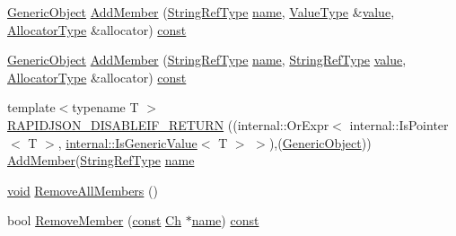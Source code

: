\begin{DoxyCompactItemize}
\item 
\hyperlink{classGenericObject}{Generic\+Object} \hyperlink{classGenericObject_a011a0dd06baf841e3f6e21a3c95db3c1}{Add\+Member} (\hyperlink{classGenericObject_a9b8381fc96f5f89b2163b052ed66cc59}{String\+Ref\+Type} \hyperlink{imgui__impl__opengl3__loader_8h_a5c4947d4516dd7cfa3505ce3a648a4ef}{name}, \hyperlink{classGenericObject_a930aa30f89caee7ba7bff60bf9dc21b1}{Value\+Type} \&\hyperlink{imgui__impl__opengl3__loader_8h_a32aff7c6c4cd253fdf6563677afab5ce}{value}, \hyperlink{classGenericObject_a00c8cee952d5ebadc5e1c309aa489ad9}{Allocator\+Type} \&allocator) \hyperlink{classGenericObject_af70c9646b5e422306c33e98b3d8783a7}{const}
\item 
\hyperlink{classGenericObject}{Generic\+Object} \hyperlink{classGenericObject_a3af43681aea03c4313d689bcbf5e3363}{Add\+Member} (\hyperlink{classGenericObject_a9b8381fc96f5f89b2163b052ed66cc59}{String\+Ref\+Type} \hyperlink{imgui__impl__opengl3__loader_8h_a5c4947d4516dd7cfa3505ce3a648a4ef}{name}, \hyperlink{classGenericObject_a9b8381fc96f5f89b2163b052ed66cc59}{String\+Ref\+Type} \hyperlink{imgui__impl__opengl3__loader_8h_a32aff7c6c4cd253fdf6563677afab5ce}{value}, \hyperlink{classGenericObject_a00c8cee952d5ebadc5e1c309aa489ad9}{Allocator\+Type} \&allocator) \hyperlink{classGenericObject_af70c9646b5e422306c33e98b3d8783a7}{const}
\item 
{\footnotesize template$<$typename T $>$ }\\\hyperlink{classGenericObject_af361a4b677882964789201fc605541d0}{R\+A\+P\+I\+D\+J\+S\+O\+N\+\_\+\+D\+I\+S\+A\+B\+L\+E\+I\+F\+\_\+\+R\+E\+T\+U\+RN} ((internal\+::\+Or\+Expr$<$ internal\+::\+Is\+Pointer$<$ T $>$, \hyperlink{structinternal_1_1IsGenericValue}{internal\+::\+Is\+Generic\+Value}$<$ T $>$ $>$),(\hyperlink{classGenericObject}{Generic\+Object})) \hyperlink{classGenericObject_a3668524c8566c46cbae97d938064f5fa}{Add\+Member}(\hyperlink{classGenericObject_a9b8381fc96f5f89b2163b052ed66cc59}{String\+Ref\+Type} \hyperlink{imgui__impl__opengl3__loader_8h_a5c4947d4516dd7cfa3505ce3a648a4ef}{name}
\item 
\hyperlink{imgui__impl__opengl3__loader_8h_ac668e7cffd9e2e9cfee428b9b2f34fa7}{void} \hyperlink{classGenericObject_a129ce3843a6658e620a7f740d9f44ee1}{Remove\+All\+Members} ()
\item 
bool \hyperlink{classGenericObject_aebeda9c2cac6afd56dda55caaf2c4a0c}{Remove\+Member} (\hyperlink{classGenericObject_af70c9646b5e422306c33e98b3d8783a7}{const} \hyperlink{classGenericObject_ac6747e5baa13e15bcea1658b5624647a}{Ch} $\ast$\hyperlink{imgui__impl__opengl3__loader_8h_a5c4947d4516dd7cfa3505ce3a648a4ef}{name}) \hyperlink{classGenericObject_af70c9646b5e422306c33e98b3d8783a7}{const}

\end{DoxyCompactItemize}
